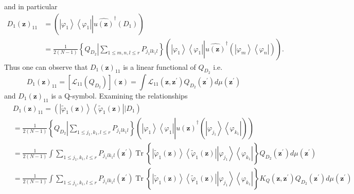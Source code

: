 \documentclass[aps,preprint]{revtex4}%
\begin{document}
and in particular
\begin{align}
D_{1}\left(  \mathbf{z}\right)  _{11} &  =\left(  \left\vert \varphi
_{1}\right\rangle \left\langle \varphi_{1}\right\vert \left\vert
\widehat{u\left(  \mathbf{z}\right)  }^{\dagger}\left(  D_{1}\right)  \right.
\right)  \nonumber\\
&  =\frac{1}{2\left(  N-1\right)  }\left\{  Q_{D_{2}}\left\vert \sum_{1\leq
m,n,l\leq r}P_{j_{1}lk_{1}l}\right.  \right\}  \left(  \left\vert \varphi
_{1}\right\rangle \left\langle \varphi_{1}\right\vert \left\vert
\widehat{u\left(  \mathbf{z}\right)  }^{\dagger}\left(  \overset{}{\left\vert
\varphi_{m}\right\rangle \left\langle \varphi_{n}\right\vert }\right)
\right.  \right)  .
\end{align}
Thus one can observe that $D_{1}\left(  \mathbf{z}\right)  _{11}$ is a linear
functional of $Q_{D_{2}}$ i.e.
\begin{equation}
D_{1}\left(  \mathbf{z}\right)  _{11}=\left[  \mathcal{L}_{11}\left(
Q_{D_{2}}\right)  \right]  \left(  \mathbf{z}\right)  =\int\mathcal{L}%
_{11}\left(  \mathbf{z,z}^{\prime}\right)  Q_{D_{2}}\left(  \mathbf{z}%
^{\prime}\right)  d\mu\left(  \mathbf{z}^{\prime}\right)
\end{equation}
and $D_{1}\left(  \mathbf{z}\right)  _{11}$ is a Q-symbol$.$ Examining the
relationships
\begin{align}
&  D_{1}\left(  \mathbf{z}\right)  _{11}=\left(  \left\vert \tilde{\varphi
}_{1}\left(  \mathbf{z}\right)  \right\rangle \left\langle \tilde{\varphi}%
_{1}\left(  \mathbf{z}\right)  \right\vert \left\vert D_{1}\right.  \right)
\nonumber\\
&  =\frac{1}{2\left(  N-1\right)  }\left\{  Q_{D_{2}}\left\vert \sum_{1\leq
j_{1},k_{1},l\leq r}P_{j_{1}lk_{1}l}\right.  \right\}  \left(  \left\vert
\varphi_{1}\right\rangle \left\langle \varphi_{1}\right\vert \left\vert
\widehat{u\left(  \mathbf{z}\right)  }^{\dagger}\left(  \overset{}{\left\vert
\varphi_{j_{1}}\right\rangle \left\langle \varphi_{k_{1}}\right\vert }\right)
\right.  \right)  \nonumber\\
&  =\frac{1}{2\left(  N-1\right)  }\int\sum_{1\leq j_{1},k_{1},l\leq
r}P_{j_{1}lk_{1}l}\left(  \mathbf{z}^{\prime}\right)  \operatorname*{Tr}%
\left\{  \left\vert \tilde{\varphi}_{1}\left(  \mathbf{z}\right)
\right\rangle \left\langle \tilde{\varphi}_{1}\left(  \mathbf{z}\right)
\right\vert \overset{}{\left\vert \varphi_{j_{1}}\right\rangle \left\langle
\varphi_{k_{1}}\right\vert }\right\}  Q_{D_{2}}\left(  \mathbf{z}^{\prime
}\right)  d\mu\left(  \mathbf{z}^{\prime}\right)  \nonumber\\
&  =\frac{1}{2\left(  N-1\right)  }\int\sum_{1\leq j_{1},k_{1},l\leq
r}P_{j_{1}lk_{1}l}\left(  \mathbf{z}^{\prime}\right)  \operatorname*{Tr}%
\left\{  \left\vert \tilde{\varphi}_{1}\left(  \mathbf{z}\right)
\right\rangle \left\langle \tilde{\varphi}_{1}\left(  \mathbf{z}\right)
\right\vert \overset{}{\left\vert \varphi_{j_{1}}\right\rangle \left\langle
\varphi_{k_{1}}\right\vert }\right\}  K_{Q}\left(  \mathbf{z,z}^{\prime
}\right)  Q_{D_{2}}\left(  \mathbf{z}^{\prime}\right)  d\mu\left(
\mathbf{z}^{\prime}\right)
\end{align}
\end{document}
